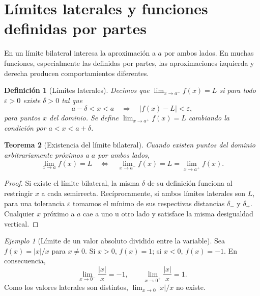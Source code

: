 \documentclass[12pt]{article}
\newtheorem{definicion}{Definición}[section]
\newtheorem{teorema}[definicion]{Teorema}
\theoremstyle{remark}
\newtheorem{ejemplo}{Ejemplo}
\begin{document}
\section{Límites laterales y funciones definidas por partes}
En un límite bilateral interesa la aproximación a $a$ por ambos lados. En muchas funciones, especialmente las definidas por partes, las aproximaciones izquierda y derecha producen comportamientos diferentes.

\begin{definicion}[Límites laterales]
Decimos que $\lim_{x\to a^-}f(x)=L$ si para todo $\varepsilon>0$ existe $\delta>0$ tal que
\[
 a-\delta<x<a\quad\Longrightarrow\quad |f(x)-L|<\varepsilon,
\]
para puntos $x$ del dominio. Se define $\lim_{x\to a^+}f(x)=L$ cambiando la condición por $a<x<a+\delta$.
\end{definicion}

\begin{teorema}[Existencia del límite bilateral]
Cuando existen puntos del dominio arbitrariamente próximos a $a$ por ambos lados,
\[
 \boxed{\lim_{x\to a}f(x)=L\quad\Longleftrightarrow\quad
 \lim_{x\to a^-}f(x)=L=\lim_{x\to a^+}f(x).}
\]
\end{teorema}
\begin{proof}
Si existe el límite bilateral, la misma $\delta$ de su definición funciona al restringir $x$ a cada semirrecta. Recíprocamente, si ambos límites laterales son $L$, para una tolerancia $\varepsilon$ tomamos el mínimo de sus respectivas distancias $\delta_-$ y $\delta_+$. Cualquier $x$ próximo a $a$ cae a uno u otro lado y satisface la misma desigualdad vertical.
\end{proof}

\begin{ejemplo}[Límite de un valor absoluto dividido entre la variable]
Sea $f(x)=|x|/x$ para $x\ne0$. Si $x>0$, $f(x)=1$; si $x<0$, $f(x)=-1$. En consecuencia,
\[
 \lim_{x\to0^-}\frac{|x|}{x}=-1,\qquad
 \lim_{x\to0^+}\frac{|x|}{x}=1.
\]
Como los valores laterales son distintos, $\lim_{x\to0}|x|/x$ no existe.
\end{ejemplo}

\begin{center}
\end{center}
\end{document}
